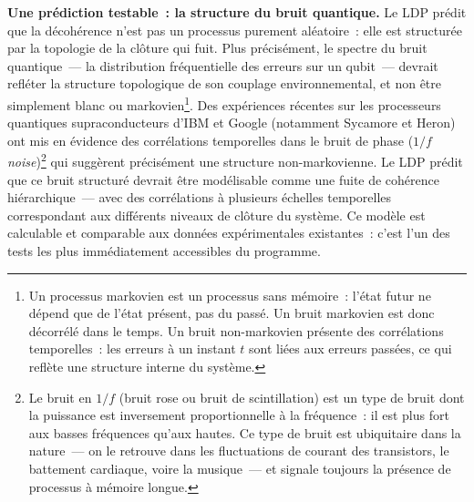 \documentclass[12pt, a4paper, openright]{book}
\begin{document}
\textbf{Une prédiction testable~: la structure du bruit quantique.} Le LDP prédit que la décohérence n'est pas un processus purement aléatoire~: elle est structurée par la topologie de la clôture qui fuit. Plus précisément, le spectre du bruit quantique~--- la distribution fréquentielle des erreurs sur un qubit~--- devrait refléter la structure topologique de son couplage environnemental, et non être simplement blanc ou markovien\footnote{Un processus markovien est un processus sans mémoire~: l'état futur ne dépend que de l'état présent, pas du passé. Un bruit markovien est donc décorrélé dans le temps. Un bruit non-markovien présente des corrélations temporelles~: les erreurs à un instant $t$ sont liées aux erreurs passées, ce qui reflète une structure interne du système.}. Des expériences récentes sur les processeurs quantiques supraconducteurs d'IBM et Google (notamment Sycamore et Heron) ont mis en évidence des corrélations temporelles dans le bruit de phase (\emph{$1/f$ noise})\footnote{Le bruit en $1/f$ (bruit rose ou bruit de scintillation) est un type de bruit dont la puissance est inversement proportionnelle à la fréquence~: il est plus fort aux basses fréquences qu'aux hautes. Ce type de bruit est ubiquitaire dans la nature~--- on le retrouve dans les fluctuations de courant des transistors, le battement cardiaque, voire la musique~--- et signale toujours la présence de processus à mémoire longue.} qui suggèrent précisément une structure non-markovienne. Le LDP prédit que ce bruit structuré devrait être modélisable comme une fuite de cohérence hiérarchique~--- avec des corrélations à plusieurs échelles temporelles correspondant aux différents niveaux de clôture du système. Ce modèle est calculable et comparable aux données expérimentales existantes~: c'est l'un des tests les plus immédiatement accessibles du programme.

\medskip
\end{document}
